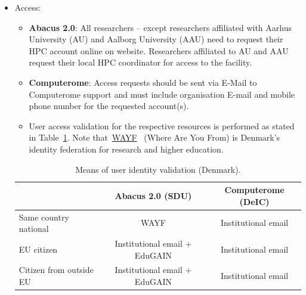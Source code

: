 \documentclass{article}
\begin{document}
\begin{itemize}
\begin{itemize}
    \end{itemize} 
    \item[]Access:
    \begin{itemize} 
        \item[]\textbf{Abacus 2.0}: All researchers – except researchers affiliated with Aarhus University (AU) and Aalborg University (AAU) need to request their HPC account online on website. Researchers affiliated to AU and AAU request their local HPC coordinator for access to the facility.
        \item[]\textbf{Computerome}: Access requests should be sent via E-Mail to Computerome support and must include organisation E-mail and mobile phone number for the requested account(s).
        \item[]User access validation for the respective resources is performed as stated in Table~\ref{tab:DK_user_acc_val}.
 Note that~\href{https://wayf.dk}{WAYF}~\cite{wayf} (Where Are You From)
 is Denmark's identity federation for research and higher education.
\end{itemize} 
    \begin{table}[!h]
       \centering
        \begin{tabular}{|l|c|c|}
            \hline
        & Abacus 2.0 (SDU) & Computerome (DeIC) \\
        \hline
      Same country national  & WAYF  
      & Institutional email \\
        \hline
        EU citizen      &  Institutional email + EduGAIN   & Institutional email \\
            \hline
            Citizen from outside EU	        &  Institutional email + EduGAIN   & Institutional email \\
            \hline
            \end{tabular}
        \caption{Means of user identity validation (Denmark).}
        \label{tab:DK_user_acc_val}
    \end{table}
\end{itemize} 
\end{document}
